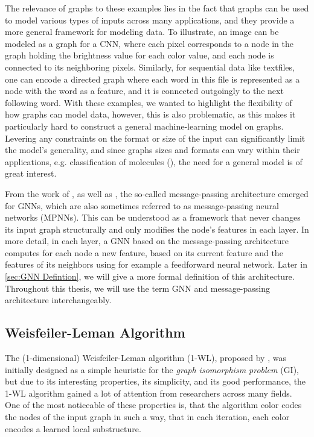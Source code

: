 \documentclass[11pt, dvipsnames, DIV=12]{scrreprt}
\theoremstyle{definition}
\begin{document}
The relevance of graphs to these examples lies in the fact that graphs can be used to model various types of inputs across many applications, and they provide a more general framework for modeling data. To illustrate, an image can be modeled as a graph for a CNN, where each pixel corresponds to a node in the graph holding the brightness value for each color value, and each node is connected to its neighboring pixels. Similarly, for sequential data like textfiles, one can encode a directed graph where each word in this file is represented as a node with the word as a feature, and it is connected outgoingly to the next following word. With these examples, we wanted to highlight the flexibility of how graphs can model data, however, this is also problematic, as this makes it particularly hard to construct a general machine-learning model on graphs. Levering any constraints on the format or size of the input can significantly limit the model's generality, and since graphs sizes and formats can vary within their applications, e.g. classification of molecules (\cite{Mor+2020}), the need for a general model is of great interest.

From the work of \cite{Gil+2017}, as well as \cite{Sca+2009}, the so-called message-passing architecture emerged for GNNs, which are also sometimes referred to as message-passing neural networks (MPNNs). This can be understood as a framework that never changes its input graph structurally and only modifies the node's features in each layer. In more detail, in each layer, a GNN based on the message-passing architecture computes for each node a new feature, based on its current feature and the features of its neighbors using for example a feedforward neural network. Later in \autoref{sec:GNN Defintion}, we will give a more formal definition of this architecture.
Throughout this thesis, we will use the term GNN and message-passing architecture interchangeably.
 

\subsection{Weisfeiler-Leman Algorithm}
The (1-dimensional) Weisfeiler-Leman algorithm (1-WL), proposed by \cite{Wei+1968}, was initially designed as a simple heuristic for the \textit{graph isomorphism problem} (\textsc{GI}), but due to its interesting properties, its simplicity, and its good performance, the 1-WL algorithm gained a lot of attention from researchers across many fields. One of the most noticeable of these properties is, that the algorithm color codes the nodes of the input graph in such a way, that in each iteration, each color encodes a learned local substructure.
\end{document}
